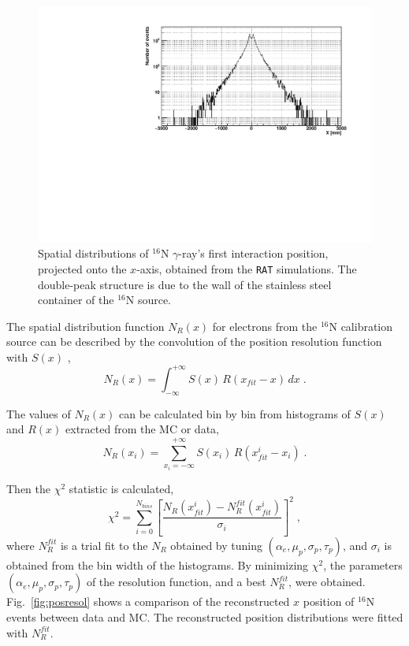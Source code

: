 \begin{figure}[!htb]
	\centering
	\includegraphics[width=12cm]{sx.pdf}
	\caption[Spatial distribution of {$^{16}$}N $\gamma$-ray's first interaction positions, projected onto the $x$-axis.]{Spatial distributions of {$^{16}$}N $\gamma$-ray's first interaction position, projected onto the $x$-axis, obtained from the \texttt{RAT} simulations. The double-peak structure is due to the wall of the stainless steel container of the $^{16}$N source.\label{hsx}}
\end{figure}

The spatial distribution function $N_{R}(x)$ for electrons from the $^{16}$N calibration source can be described by the convolution of the position resolution function with $S(x)$ \cite{boulay2004direct},
\begin{equation}
N_{R}(x)=\int^{+\infty}_{-\infty} S(x) \, R(x_{fit} - x) \, dx \; .
\end{equation}

The values of $N_{R}(x)$ can be calculated bin by bin from histograms of $S(x)$ and $R(x)$ extracted from the MC or data, 
\begin{equation}
N_R(x_i)=\sum_{x_i=-\infty}^{+\infty}S(x_i) \, R(x_{fit}^i-x_i) \; .
\end{equation}

Then the $\chi^2$ statistic is calculated, 
\begin{equation}
\chi^2=\sum^{N_{bins}}_{i=0}[\frac{N_R(x_{fit}^i)-N_R^{fit}(x_{fit}^i)}{\sigma_i}]^2 \; ,
\end{equation}
where $N_R^{fit}$ is a trial fit to the $N_R$ obtained by tuning $(\alpha_e,\mu_p,\sigma_p,\tau_p)$, and $\sigma_i$ is obtained from the bin width of the histograms. By minimizing $\chi^2$, the parameters $(\alpha_e,\mu_p,\sigma_p,\tau_p)$ of the resolution function, and a best $N_R^{fit}$, were obtained. Fig.~\ref{fig:posresol} shows a comparison of the reconstructed $x$ position of {$^{16}$}N events between data and MC. The reconstructed position distributions were fitted with $N_R^{fit}$.

